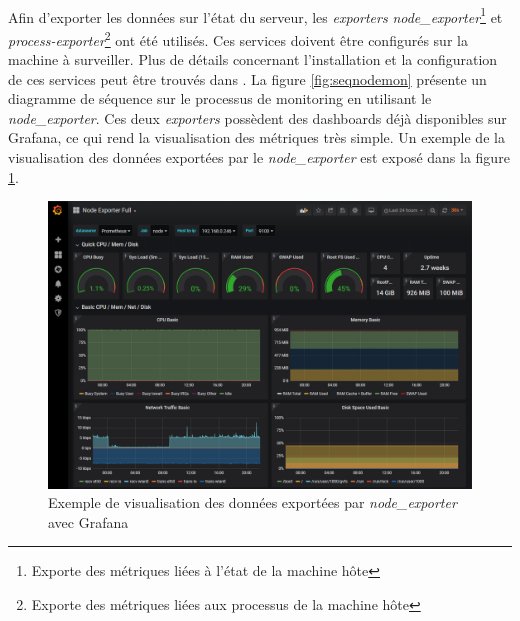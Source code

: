 ~

\noindent
Afin d'exporter les données sur l'état du serveur, les \textit{exporters} \textit{node\_exporter}\footnote{Exporte des métriques liées à l'état de la machine hôte} et \textit{process-exporter}\footnote{Exporte des métriques liées aux processus de la machine hôte} ont été utilisés. Ces services doivent être configurés sur la machine à surveiller. Plus de détails concernant l'installation et la configuration de ces services peut être trouvés dans \cite{node_exporter_github, process_exporter_github, prometheus_exporters}. La figure \ref{fig:seqnodemon} présente un diagramme de séquence sur le processus de monitoring en utilisant le \textit{node\_exporter}. Ces deux \textit{exporters} possèdent des dashboards déjà disponibles sur Grafana, ce qui rend la visualisation des métriques très simple. Un exemple de la visualisation des données exportées par le \textit{node\_exporter} est exposé dans la figure \ref{fig:grafnode}.


\begin{figure}
  \includegraphics[width=\textwidth]{img/app/grafana_example.png}
  \caption{Exemple de visualisation des données exportées par \textit{node\_exporter} avec Grafana}
  \label{fig:grafnode}
\end{figure}


